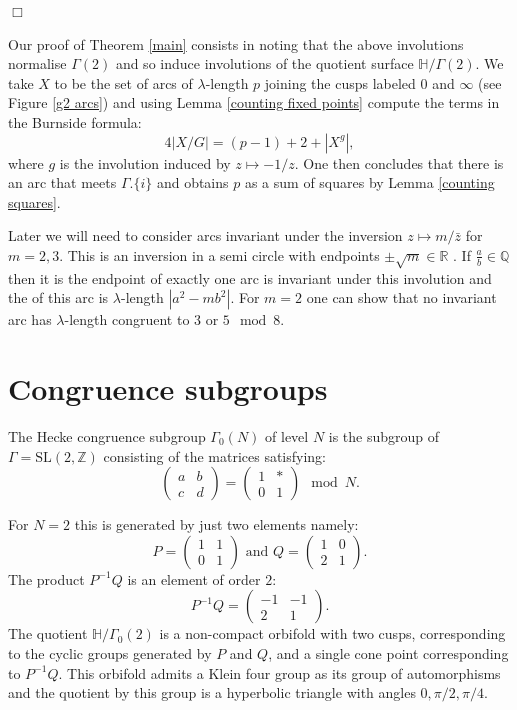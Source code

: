 \documentclass[12pt,a4paper]{amsart}
\def\HH{\mathbb{H}}
\def\oo{\HH / \Gamma_0(2)}
\def\g2{\Gamma(2)}
\def\xx{\HH/\g2}
\def\ZZ{\mathbb{Z}}
\begin{document}
\hfill $\Box$

Our proof  of Theorem \ref{main} consists in noting that the above involutions normalise $\g2$
and so induce involutions of the quotient surface $\xx$.
We take $X$ to be the set of arcs of $\lambda$-length $p$ joining
the cusps labeled $0$ and $\infty$ (see Figure \ref{g2 arcs})
and using Lemma \ref{counting fixed points} compute the terms in the
Burnside formula:
$$
4 |X/G|   = (p-1) + 2 + |X^g|,$$
	where $g$ is the involution induced by $z\mapsto -1 /
	z.$
One then concludes that there is an arc that meets $\Gamma.\{i\}$
and obtains
$p$ as a sum of squares by Lemma \ref{counting squares}.


Later we will need to consider arcs invariant under the inversion
$z\mapsto m / \bar{z}$ for $m=2,3$.
This is an inversion in a semi circle with endpoints $\pm \sqrt{m}
\in \mathbb{R}$ .
If $\frac{a}{b}\in \mathbb{Q}$ then it is the endpoint of exactly
one  arc is invariant under this involution and the
of this arc is $\lambda$-length $|a^2 - m b^2|$.
For $m=2$ one can show 
that no invariant arc has $\lambda$-length congruent to $3$ or $5 \mod 8$.



\section{Congruence subgroups}

The Hecke congruence subgroup $\Gamma_0(N)$ of level $N$ is the subgroup of
$\Gamma = \mathrm{SL}(2,\ZZ)$ 
consisting of the matrices satisfying:
$$ \begin{pmatrix} a & b \\ c & d \end{pmatrix} = 
\begin{pmatrix} 1 & * \\ 0 & 1 \end{pmatrix} \mod N.$$

For $N=2$ this is generated by just two elements namely:
$$ P = \begin{pmatrix} 1 & 1 \\ 0 & 1 \end{pmatrix} \text{ and } Q=  \begin{pmatrix} 1 & 0 \\ 2 & 1 \end{pmatrix}.$$
The product $P^{-1}Q$ is an element of order $2$:
$$ P^{-1}Q = \begin{pmatrix} -1 & -1 \\ 2 & 1 \end{pmatrix}.$$
The quotient $\oo$ is a non-compact orbifold with two cusps,
corresponding to the cyclic groups generated by $P$ and $Q$, and a
single cone point corresponding to $P^{-1}Q$.
This orbifold admits a Klein four group as its group of
automorphisms
and the quotient by this group is a hyperbolic triangle with angles
$0, \pi/2, \pi/4$.
\end{document}
